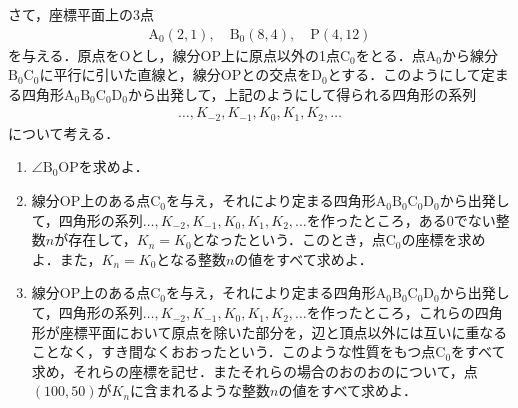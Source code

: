 さて，座標平面上の$3$点
\begin{align}
  \text{A}_0(2, 1), \quad \text{B}_0(8, 4), \quad \text{P}(4, 12)
\end{align}
を与える．原点を$\text{O}$とし，線分$\text{OP}$上に原点以外の1点$\text{C}_0$をとる．点$\text{A}_0$から線分$\text{B}_0 \text{C}_0$に平行に引いた直線と，線分$\text{OP}$との交点を$\text{D}_0$とする．このようにして定まる四角形$\text{A}_0 \text{B}_0 \text{C}_0 \text{D}_0$から出発して，上記のようにして得られる四角形の系列
\begin{align}
  \dots, K_{-2}, K_{-1}, K_0, K_1, K_2, \dots
\end{align}
について考える．
\begin{enumerate}
  \item $\angle \text{B}_0\text{O}\text{P}$を求めよ．
  \item 線分$\text{OP}$上のある点$\text{C}_0$を与え，それにより定まる四角形$\text{A}_0 \text{B}_0 \text{C}_0 \text{D}_0$から出発して，四角形の系列$\dots, K_{-2}, K_{-1}, K_0, K_1, K_2, \dots$を作ったところ，ある0でない整数$n$が存在して，$K_n = K_0$となったという．このとき，点$\text{C}_0$の座標を求めよ．また，$K_n = K_0$となる整数$n$の値をすべて求めよ．
  \item 線分$\text{OP}$上のある点$\text{C}_0$を与え，それにより定まる四角形$\text{A}_0 \text{B}_0 \text{C}_0 \text{D}_0$から出発して，四角形の系列$\dots, K_{-2}, K_{-1}, K_0, K_1, K_2, \dots$を作ったところ，これらの四角形が座標平面において原点を除いた部分を，辺と頂点以外には互いに重なることなく，すき間なくおおったという．このような性質をもつ点$\text{C}_0$をすべて求め，それらの座標を記せ．またそれらの場合のおのおのについて，点$(100, 50)$が$K_n$に含まれるような整数$n$の値をすべて求めよ．
\end{enumerate}

\begin{figure}[H]
  \centering
\end{figure}

